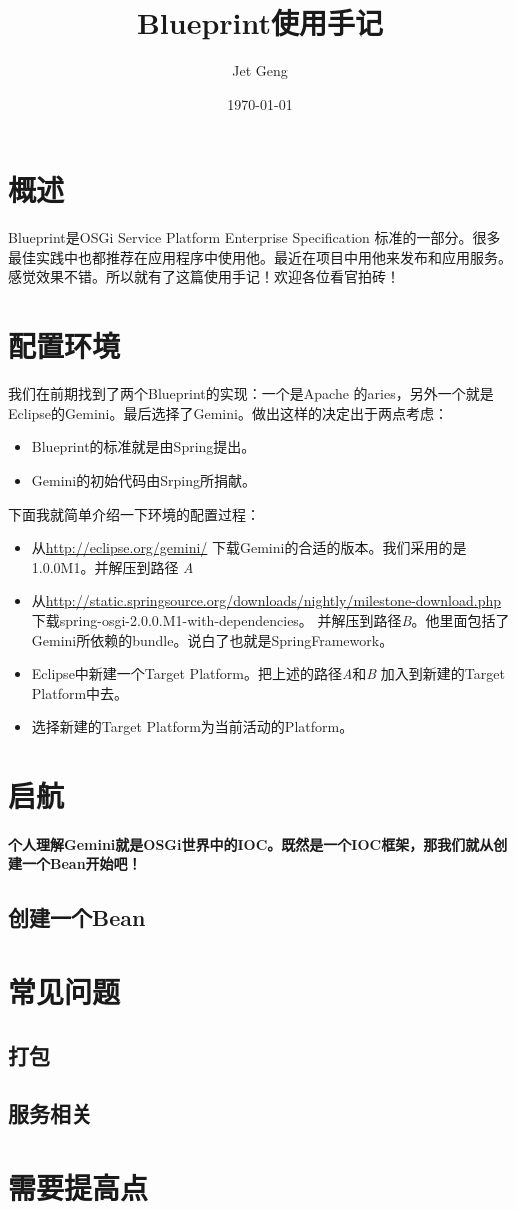 \documentclass[a4paper,11pt,onecolumn,oneside]{article}
\title{Blueprint使用手记}
\author{Jet Geng}
\date{\today}
\begin{document}
\maketitle
\section{概述}
Blueprint是OSGi Service Platform Enterprise Specification 标准的一部分。很多最佳实践中也都推荐在应用程序中使用他。最近在项目中用他来发布和应用服务。感觉效果不错。所以就有了这篇使用手记！欢迎各位看官拍砖！
\section{配置环境}
我们在前期找到了两个Blueprint的实现：一个是Apache 的aries，另外一个就是Eclipse的Gemini。最后选择了Gemini。做出这样的决定出于两点考虑：
\begin{itemize}
    \item Blueprint的标准就是由Spring提出。
    \item Gemini的初始代码由Srping所捐献。
\end{itemize}
下面我就简单介绍一下环境的配置过程：
\begin{itemize}
    \item 从\url{http://eclipse.org/gemini/} 下载Gemini的合适的版本。我们采用的是1.0.0M1。并解压到路径 \emph{A}
    \item 从\url{http://static.springsource.org/downloads/nightly/milestone-download.php}下载spring-osgi-2.0.0.M1-with-dependencies。 并解压到路径\emph{B}。他里面包括了Gemini所依赖的bundle。说白了也就是SpringFramework。
    \item Eclipse中新建一个Target Platform。把上述的路径\emph{A}和\emph{B} 加入到新建的Target Platform中去。
    \item 选择新建的Target Platform为当前活动的Platform。
\end{itemize}
\section{启航}
\paragraph{个人理解Gemini就是OSGi世界中的IOC。既然是一个IOC框架，那我们就从创建一个Bean开始吧！}
\subsection{创建一个Bean}

\section{常见问题}
\subsection{打包}
\subsection{服务相关}
\section{需要提高点}
\end{document}
